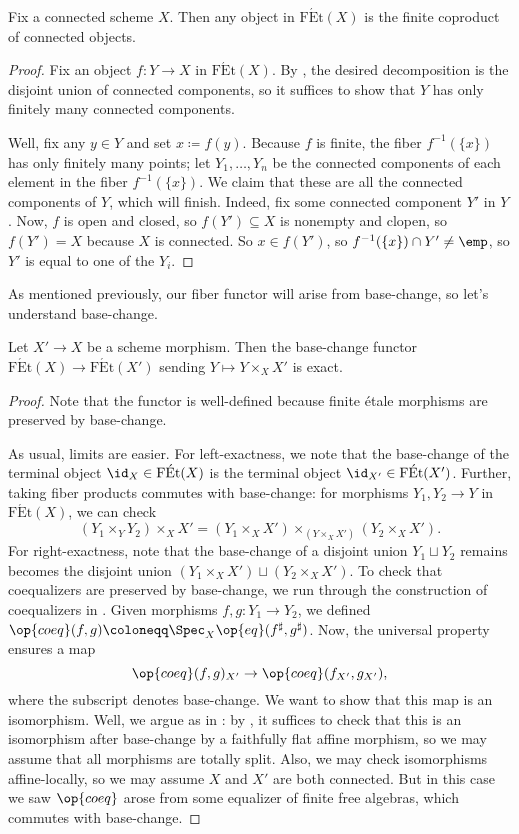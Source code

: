 \documentclass{amsart}
\begin{document}
\begin{proposition} \label{prop:fin-et-connected-decomp}
    Fix a connected scheme $X$. Then any object in $\mathrm{F\acute Et}(X)$ is the finite coproduct of connected objects.
\end{proposition}
\begin{proof}
    Fix an object $f\colon Y\to X$ in $\mathrm{F\acute Et}(X)$. By , the desired decomposition is the disjoint union of connected components, so it suffices to show that $Y$ has only finitely many connected components.
    
    Well, fix any $y\in Y$ and set $x\coloneqq f(y)$. Because $f$ is finite, the fiber $f^{-1}(\{x\})$ has only finitely many points; let $Y_1,\ldots,Y_n$ be the connected components of each element in the fiber $f^{-1}(\{x\})$. We claim that these are all the connected components of $Y$, which will finish. Indeed, fix some connected component $Y'$ in $Y$. Now, $f$ is open and closed, so $f(Y')\subseteq X$ is nonempty and clopen, so $f(Y')=X$ because $X$ is connected. So $x\in f(Y')$, so $f^{-1}(\{x\})\cap Y'\ne\emp$, so $Y'$ is equal to one of the $Y_i$.
\end{proof}
As mentioned previously, our fiber functor will arise from base-change, so let's understand base-change.
\begin{lemma} \label{lem:exact-base-change}
    Let $X'\to X$ be a scheme morphism. Then the base-change functor $\mathrm{F\acute Et}(X)\to\mathrm{F\acute Et}(X')$ sending $Y\mapsto Y\times_XX'$ is exact.
\end{lemma}
\begin{proof}
    Note that the functor is well-defined because finite \'etale morphisms are preserved by base-change.

    As usual, limits are easier. For left-exactness, we note that the base-change of the terminal object ${\id_X}\in\mathrm{F\acute Et}(X)$ is the terminal object ${\id_{X'}}\in\mathrm{F\acute Et}(X')$. Further, taking fiber products commutes with base-change: for morphisms $Y_1,Y_2\to Y$ in $\mathrm{F\acute Et}(X)$, we can check
    \[(Y_1\times_YY_2)\times_XX'=(Y_1\times_XX')\times_{(Y\times_XX')}(Y_2\times_XX').\]
    For right-exactness, note that the base-change of a disjoint union $Y_1\sqcup Y_2$ remains becomes the disjoint union $(Y_1\times_XX')\sqcup(Y_2\times_XX')$. To check that coequalizers are preserved by base-change, we run through the construction of coequalizers in . Given morphisms $f,g\colon Y_1\to Y_2$, we defined $\op{coeq}(f,g)\coloneqq\Spec_X\op{eq}(f^\sharp,g^\sharp)$. Now, the universal property ensures a map
    \[\op{coeq}(f,g)_{X'}\to\op{coeq}(f_{X'},g_{X'}),\]
    where the subscript denotes base-change. We want to show that this map is an isomorphism. Well, we argue as in : by , it suffices to check that this is an isomorphism after base-change by a faithfully flat affine morphism, so we may assume that all morphisms are totally split. Also, we may check isomorphisms affine-locally, so we may assume $X$ and $X'$ are both connected. But in this case we saw $\op{coeq}$ arose from some equalizer of finite free algebras, which commutes with base-change.
\end{proof}
\end{document}

